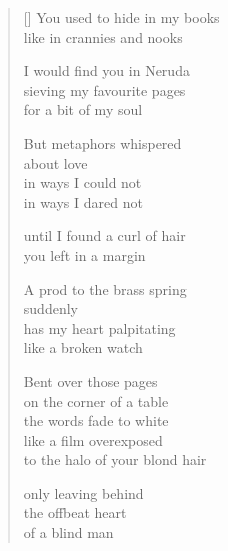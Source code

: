 \documentclass[12pt,a4paper]{article}
\begin{document}

\newpage

\poemtitle{}

\settowidth{\versewidth}{to the halo of your blond hair}

\bigskip

\begin{verse}[\versewidth]
  You used to hide in my books \\
  like in crannies and nooks

  I would find you in Neruda \\
  sieving my favourite pages \\
  for a bit of my soul

  But metaphors whispered \\
  about love \\
  in ways I could not \\
  in ways I dared not

  until I found a curl of hair \\
  you left in a margin

  A prod to the brass spring \\
  suddenly \\
  has my heart palpitating \\
  like a broken watch

  Bent over those pages \\
  on the corner of a table \\
  the words fade to white \\
  like a film overexposed \\
  to the halo of your blond hair

  only leaving behind \\
  the offbeat heart \\
  of a blind man
\end{verse}


\newpage

\poemtitle{}

\settowidth{\versewidth}{on your body of soft amber}

\bigskip
\end{document}
